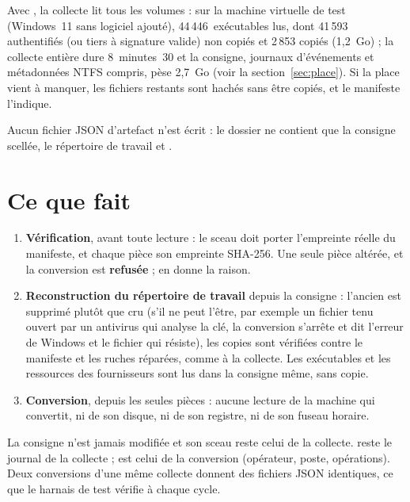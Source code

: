\documentclass[11pt,a4paper,oneside]{report}
\begin{document}
\begin{attention}
Avec , la collecte lit tous les volumes : sur la machine
virtuelle de test (Windows~11 sans logiciel ajouté), 44\,446~exécutables lus,
dont 41\,593 authentifiés (ou tiers à signature valide) non copiés et
2\,853 copiés (1,2~Go) ; la collecte entière dure 8~minutes~30 et la consigne,
journaux d'événements et métadonnées NTFS compris, pèse 2,7~Go (voir la
section~\ref{sec:place}). Si la place vient à manquer, les fichiers
restants sont hachés sans être copiés, et le manifeste l'indique.
\end{attention}

Aucun fichier JSON d'artefact n'est écrit : le dossier ne contient que la
consigne scellée, le répertoire de travail et .

\section{Ce que fait }

\begin{enumerate}
  \item \textbf{Vérification}, avant toute lecture : le sceau doit porter
        l'empreinte réelle du manifeste, et chaque pièce son empreinte SHA-256.
        Une seule pièce altérée, et la conversion est \textbf{refusée} ;
         en donne la raison.
  \item \textbf{Reconstruction du répertoire de travail} depuis la consigne :
        l'ancien est supprimé plutôt que cru (s'il ne peut l'être, par exemple
        un fichier tenu ouvert par un antivirus qui analyse la clé, la
        conversion s'arrête et dit l'erreur de Windows et le fichier qui
        résiste), les copies sont vérifiées contre
        le manifeste et les ruches réparées, comme à la collecte. Les
        exécutables et les ressources des fournisseurs sont lus dans la
        consigne même, sans copie.
  \item \textbf{Conversion}, depuis les seules pièces : aucune lecture de la
        machine qui convertit, ni de son disque, ni de son registre, ni de son
        fuseau horaire.
\end{enumerate}

La consigne n'est jamais modifiée et son sceau reste celui de la collecte.
 reste le journal de la collecte ;
 est celui de la conversion (opérateur, poste,
opérations). Deux conversions d'une même collecte donnent des fichiers JSON
identiques, ce que le harnais de test vérifie à chaque cycle.
\end{document}
